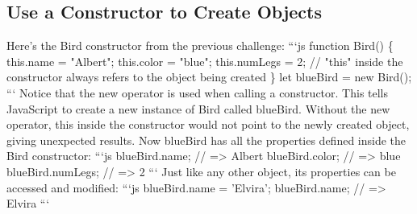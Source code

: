 \documentclass{article}%
\begin{document}
\subsection{Use a Constructor to Create Objects}%
\label{subsec:UseaConstructortoCreateObjects}%
Here's the Bird constructor from the previous challenge:\newline%
```js\newline%
function Bird() \{\newline%
  this.name = "Albert";\newline%
  this.color  = "blue";\newline%
  this.numLegs = 2;\newline%
  // "this" inside the constructor always refers to the object being created\newline%
\}\newline%
let blueBird = new Bird();\newline%
```\newline%
Notice that the new operator is used when calling a constructor. This tells JavaScript to create a new instance of Bird called blueBird. Without the new operator, this inside the constructor would not point to the newly created object, giving unexpected results.\newline%
Now blueBird has all the properties defined inside the Bird constructor:\newline%
```js\newline%
blueBird.name; // => Albert\newline%
blueBird.color; // => blue\newline%
blueBird.numLegs; // => 2\newline%
```\newline%
Just like any other object, its properties can be accessed and modified:\newline%
```js\newline%
blueBird.name = 'Elvira';\newline%
blueBird.name; // => Elvira\newline%
```\newline%

%
\end{document}
